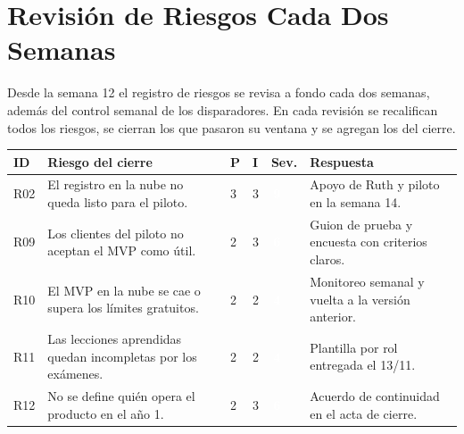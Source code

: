 \documentclass[11pt,a4paper]{article}
\newcommand{\etiqueta}[2]{{\setlength{\fboxsep}{2pt}\colorbox{#1}{\textcolor{white}{\scriptsize\bfseries #2}}}}
\begin{document}
\section{Revisión de Riesgos Cada Dos Semanas}
Desde la semana 12 el registro de riesgos se revisa a fondo cada dos semanas, además del control semanal de los disparadores. En cada revisión se recalifican todos los riesgos, se cierran los que pasaron su ventana y se agregan los del cierre.

\vspace{0.1cm}
\begin{center}
\end{center}

{\small
{}
\noindent\begin{tabularx}{\textwidth}{@{}C{0.9cm} L C{0.6cm} C{0.6cm} C{0.9cm} P{3.6cm}@{}}
\toprule
{}
\textbf{ID} & \textbf{Riesgo del cierre} & \textbf{P} & \textbf{I} & \textbf{Sev.} & \textbf{Respuesta} \\
\midrule
R02 & El registro en la nube no queda listo para el piloto. & 3 & 3 & \etiqueta{SevAlta}{\,9\,} & Apoyo de Ruth y piloto en la semana 14. \\
R09 & Los clientes del piloto no aceptan el MVP como útil. & 2 & 3 & \etiqueta{SevAlta}{\,6\,} & Guion de prueba y encuesta con criterios claros. \\
R10 & El MVP en la nube se cae o supera los límites gratuitos. & 2 & 2 & \etiqueta{SevMedia}{\,4\,} & Monitoreo semanal y vuelta a la versión anterior. \\
R11 & Las lecciones aprendidas quedan incompletas por los exámenes. & 2 & 2 & \etiqueta{SevMedia}{\,4\,} & Plantilla por rol entregada el 13/11. \\
R12 & No se define quién opera el producto en el año 1. & 2 & 3 & \etiqueta{SevAlta}{\,6\,} & Acuerdo de continuidad en el acta de cierre. \\
\bottomrule
\end{tabularx}
}
\end{document}
